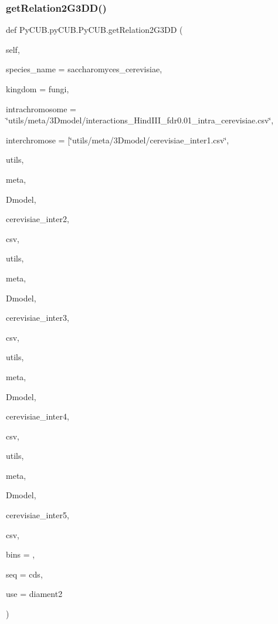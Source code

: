 \subsubsection{\texorpdfstring{get\+Relation2\+G3\+D\+D()}{getRelation2G3DD()}}
{\footnotesize\ttfamily def Py\+C\+U\+B.\+py\+C\+U\+B.\+Py\+C\+U\+B.\+get\+Relation2\+G3\+DD (\begin{DoxyParamCaption}\item[{}]{self,  }\item[{}]{species\+\_\+name = {\ttfamily \textquotesingle{}saccharomyces\+\_\+cerevisiae\textquotesingle{}},  }\item[{}]{kingdom = {\ttfamily \textquotesingle{}fungi\textquotesingle{}},  }\item[{}]{intrachromosome = {\ttfamily \char`\"{}utils/meta/3Dmodel/interactions\+\_\+HindIII\+\_\+fdr0.01\+\_\+intra\+\_\+cerevisiae.csv\char`\"{}},  }\item[{}]{interchromose = {\ttfamily \mbox{[}\char`\"{}utils/meta/3Dmodel/cerevisiae\+\_\+inter1.csv\char`\"{}},  }\item[{}]{utils,  }\item[{}]{meta,  }\item[{}]{Dmodel,  }\item[{}]{cerevisiae\+\_\+inter2,  }\item[{}]{csv,  }\item[{}]{utils,  }\item[{}]{meta,  }\item[{}]{Dmodel,  }\item[{}]{cerevisiae\+\_\+inter3,  }\item[{}]{csv,  }\item[{}]{utils,  }\item[{}]{meta,  }\item[{}]{Dmodel,  }\item[{}]{cerevisiae\+\_\+inter4,  }\item[{}]{csv,  }\item[{}]{utils,  }\item[{}]{meta,  }\item[{}]{Dmodel,  }\item[{}]{cerevisiae\+\_\+inter5,  }\item[{}]{csv,  }\item[{}]{bins = {},  }\item[{}]{seq = {\ttfamily \textquotesingle{}cds\textquotesingle{}},  }\item[{}]{use = {\ttfamily \textquotesingle{}diament2\textquotesingle{}} }\end{DoxyParamCaption})}



